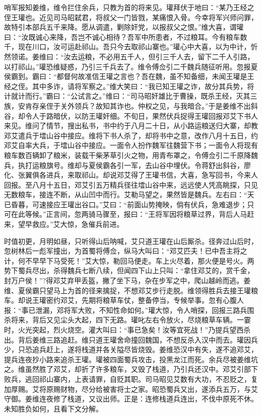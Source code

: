 哨军报知姜维，维令拦住余兵，只教为首的将来见。瓘拜伏于地曰：“某乃王经之侄王瓘也。近见司马昭弑君，将叔父一门皆戮，某痛恨入骨。今幸将军兴师问罪，故特引本部兵五千来降。愿从调遣，剿除奸党，以报叔父之恨。”维大喜，谓瓘曰：“汝既诚心来降，吾岂不诚心相待？吾军中所患者，不过粮耳。今有粮车数千，现在川口，汝可运赴祁山。吾只今去取祁山寨也。”瓘心中大喜，以为中计，忻然领诺。姜维曰：“汝去运粮，不必用五千人，但引三千人去，留下二千人引路，以打祁山。”瓘恐维疑惑，乃引三千兵去了。维令傅佥引二千魏兵随征听用。忽报夏侯霸到。霸曰：“都督何故准信王瓘之言也？吾在魏，虽不知备细，未闻王瓘是王经之侄。其中多诈，请将军察之。”维大笑曰：“我已知王瓘之诈，故分其兵势，将计就计而行。”霸曰：“公试言之。”维曰：“司马昭奸雄比于曹操，既杀王经，灭其三族，安肯存亲侄于关外领兵？故知其诈也。仲权之见，与我暗合。”于是姜维不出斜谷，却令人于路暗伏，以防王瓘奸细。不旬日，果然伏兵捉得王瓘回报邓艾下书人来见。维问了情节，搜出私书，书中约于八月二十日，从小路运粮送归大寨，却教邓艾遣兵于墵山谷中接应。维将下书人杀了，却将书中之意，改作八月十五日，约邓艾自率大兵，于墵山谷中接应。一面令人扮作魏军往魏营下书；一面令人将现有粮车数百辆卸了粮米，装载干柴茅草引火之物，用青布罩之，令傅佥引二千原降魏兵，执打运粮旗号。维却与夏侯霸各引一军，去山谷中埋伏。令蒋舒出斜谷，廖化、张翼俱各进兵，来取祁山。却说邓艾得了王瓘书信，大喜，急写回书，今来人回报。至八月十五日，邓艾引五万精兵径往墵山谷中来，远远使人凭高眺探，只见无数粮车，接连不断，从山凹中而行。艾勒马望之，果然皆是魏兵。左右曰：“天已昏暮，可速接应王瓘出谷口。”艾曰：“前面山势掩映，倘有伏兵，急难退步；只可在此等候。”正言间，忽两骑马骤至，报曰：“王将军因将粮草过界，背后人马赶来，望早救应。”艾大惊，急催兵前进。

时值初更，月明如昼，只听得山后呐喊，艾只道王瓘在山后厮杀。径奔过山后时，忽树林后一彪军撞出，为首蜀将傅佥，纵马大叫曰：“邓艾匹夫！已中吾主将之计，何不早早下马受死！”艾大惊，勒回马便走。车上火尽着，那火便是号火。两势下蜀兵尽出，杀得魏兵七断八续，但闻四下山上只叫：“拿住邓艾的，赏千金，封万户侯！”?得邓艾弃甲丢盔，撇了坐下马，杂在步军之中，爬山越岭而逃。姜维、夏侯霸只望马上为首的径来擒捉，不想邓艾步行走脱。维领得胜兵去接王瓘粮车。却说王瓘密约邓艾，先期将粮草车仗，整备停当，专候举事。忽有心腹人报：“事已泄漏，邓将军大败，不知性命如何。”瓘大惊，令人哨探，回报三路兵围杀将来，背后又见尘头大起，四下无路。瓘叱左右令放火，尽烧粮草车辆。一霎时，火光突起，烈火烧空。灌大叫曰：“事已急矣！汝等宜死战！”乃提兵望西杀出。背后姜维三路追赶。维只道王瓘舍命撞回魏国，不想反杀入汉中而去。瓘因兵少，只恐追兵赶上，遂将栈道并各关隘尽皆烧毁。姜维恐汉中有失，遂不追邓艾，提兵连夜抄小路来追杀王瓘。瓘被四面蜀兵攻击，投黑龙江而死。余兵尽被姜维坑之。维虽然胜了邓艾，却折了许多粮车，又毁了栈道，乃引兵还汉中。邓艾引部下败兵，逃回祁山寨内，上表请罪，自贬其职。司马昭见艾数有大功，不忍贬之，复加厚赐。艾将原赐财物，尽分给被害将士之家。昭恐蜀兵又出，遂添兵五万，与艾守御。姜维连夜修了栈道，又议出师。正是：连修栈道兵连出，不伐中原死不休。未知胜负如何，且看下文分解。